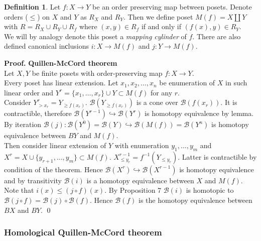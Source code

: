 \documentclass[a4paper, 12pt]{article}
\theoremstyle{definition}
\newtheorem{definition}{Definition}
\theoremstyle{remark}
\newenvironment{pf}{\noindent\textbf{Proof.}}{\qed}
\newcommand{\define}[1]{{\textit{#1}}}
\renewcommand{\leq}{\leqslant}
\renewcommand{\geq}{\geqslant}
\begin{document}
\begin{definition}
  Let $f : X \to Y$ be an order preserving map between posets. Denote orders ($\leq$) on $X$ and $Y$ as $R_X$ and $R_Y$. Then we define poset $M(f) = X \coprod Y$ with $R = R_X \cup R_Y \cup R_{f}$ where $(x,y) \in R_f$ if and only if $(f(x),y) \in R_Y$.\\

  We will by analogy denote this poset a \define{mapping cylinder} of $f$. There are also defined canonical inсlusions $i : X \to M(f)$ and $j : Y \to M(f)$.
\end{definition}

\begin{pf} \textbf{Quillen-McCord theorem}\\
  Let $X, Y$ be finite posets with order-preserving map $f : X \to Y$.\\

  Every poset has linear extension. Let $x_1, x_2, \ldots, x_n$ be enumeration of $X$ in such linear order and $Y^r = \{x_1,\ldots,x_r\} \cup Y \subset M(f)$ for any $r$.\\

  Consider $Y^r_{>x_r} = Y_{\geq f(x_r)}$. $\mathcal{B}(Y_{\geq f(x_r)})$ is a cone over $\mathcal{B}(f(x_r))$. It is contractible, therefore $\mathcal{B}(Y^{r-1}) \hookrightarrow \mathcal{B}(Y^{r})$ is homotopy equivalence by lemma. By iteration $\mathcal{B}(j) : \mathcal{B}(Y^{0}) = \mathcal{B}(Y) \hookrightarrow \mathcal{B}(M(f)) = \mathcal{B}(Y^n)$ is homotopy equivalence between $BY$ and $M(f)$.\\

  Then consider linear extension of $Y$ with enumeration $y_1,\ldots,y_m$ and $X^r = X \cup \{y_{r+1},\ldots,y_m\} \subset M(f)$. $X^{r-1}_{\leq y_r} = f^{-1}(Y_{\leqslant y_r})$. Latter is contractible by condition of the theorem. Hence $\mathcal{B}(X^{r}) \hookrightarrow \mathcal{B}(X^{r-1})$ is homotopy equivalence and by transitivity $\mathcal{B}(i)$ is a homotopy equivalence between $X$ and $M(f)$.\\

  Note that $i(x) \leqslant (j \circ f)(x)$. By Proposition 7 $\mathcal{B}(i)$ is homotopic to $\mathcal{B}(j \circ f) = \mathcal{B}(j) \circ \mathcal{B}(f)$. Hence $\mathcal{B}(f)$ is the homotopy equivalence between $BX$ and $BY$.
\end{pf}

\subsubsection{Homological Quillen-McCord theorem}
\end{document}
